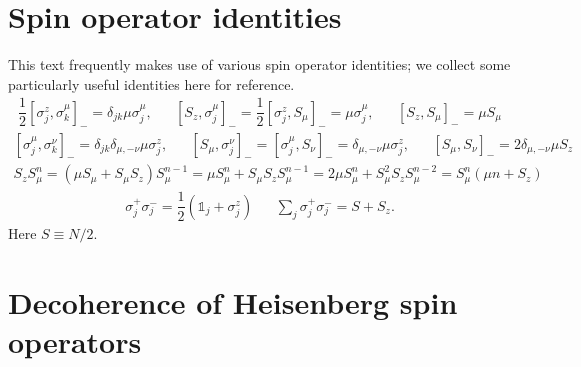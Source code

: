 \documentclass[aps,notitlepage,nofootinbib,11pt]{revtex4-1}
\newcommand{\f}[2]{\dfrac{#1}{#2}} %
\newcommand{\p}[1]{\left(#1\right)} %
\renewcommand{\sp}[1]{\left[#1\right]} %
\newcommand{\1}{\mathds{1}}
\begin{document}


\newpage
\appendix

\section{Spin operator identities}
\label{sec:identities}

This text frequently makes use of various spin operator identities; we
collect some particularly useful identities here for reference.
\begin{align}
  \f12 \sp{\sigma_j^z,\sigma_k^\mu}_- = \delta_{jk} \mu \sigma_j^\mu,
  &&
  \sp{S_z,\sigma_j^\mu}_- = \f12 \sp{\sigma_j^z,S_\mu}_-
  = \mu \sigma_j^\mu,
  &&
  \sp{S_z,S_\mu}_- = \mu S_\mu
  \label{eq:comm_z_mu}
\end{align}
\begin{align}
  \sp{\sigma_j^\mu,\sigma_k^\nu}_-
  = \delta_{jk} \delta_{\mu,-\nu} \mu \sigma_j^z,
  &&
  \sp{S_\mu,\sigma_j^\nu}_- = \sp{\sigma_j^\mu,S_\nu}_-
  = \delta_{\mu,-\nu} \mu \sigma_j^z,
  &&
  \sp{S_\mu,S_\nu}_- = 2\delta_{\mu,-\nu} \mu S_z
  \label{eq:comm_mu_nu}
\end{align}
\begin{align}
  S_z S_\mu^n
  = \p{\mu S_\mu + S_\mu S_z} S_\mu^{n-1}
  = \mu S_\mu^n + S_\mu S_z S_\mu^{n-1}
  = 2\mu S_\mu^n + S_\mu^2 S_z S_\mu^{n-2}
  = S_\mu^n \p{\mu n + S_z}
  \label{eq:comm_z_mu_n}
\end{align}
\begin{align}
  \sigma_j^+ \sigma_j^- = \f12\p{\1_j+\sigma_j^z}
  &&
  \sum_j \sigma_j^+ \sigma_j^- = S + S_z.
\end{align}
Here $S\equiv N/2$.


\section{Decoherence of Heisenberg spin operators}
\label{sec:decoherence}
\end{document}
